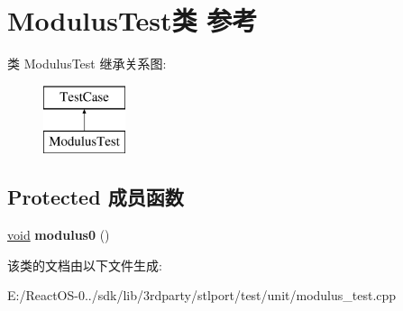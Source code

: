 \hypertarget{class_modulus_test}{}\section{Modulus\+Test类 参考}
\label{class_modulus_test}
类 Modulus\+Test 继承关系图\+:\begin{figure}[H]
\begin{center}
\leavevmode
\includegraphics[height=2.000000cm]{class_modulus_test}
\end{center}
\end{figure}
\subsection*{Protected 成员函数}
\begin{DoxyCompactItemize}
\item 
\mbox{\label{class_modulus_test_a5354622320513e9212380c834afb0f1c}} 
\hyperlink{interfacevoid}{void} {\bfseries modulus0} ()
\end{DoxyCompactItemize}


该类的文档由以下文件生成\+:\begin{DoxyCompactItemize}
\item 
E\+:/\+React\+O\+S-\/0../sdk/lib/3rdparty/stlport/test/unit/modulus\+\_\+test.\+cpp\end{DoxyCompactItemize}
